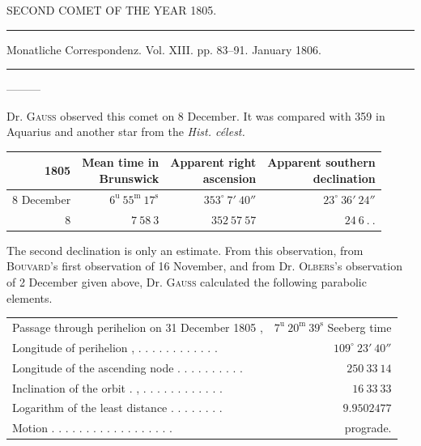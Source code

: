 \begin{center}
SECOND COMET OF THE YEAR 1805.

\rule{0.6\linewidth}{0.4pt}

Monatliche Correspondenz. Vol. XIII. pp. 83–91. January 1806.

\rule{0.6\linewidth}{0.4pt}

—\quad—\quad—
\end{center}

Dr. \textsc{Gauss} observed this comet on 8 December. It was compared with 359 in Aquarius and another star from the \emph{Hist. célest.}

\begin{center}
\begingroup\fontsize{9}{11}\selectfont\setlength{\tabcolsep}{3pt}\renewcommand{\arraystretch}{1.1}
\begin{tabular}{r|r|r|r}
1805 & \shortstack{Mean time in\\Brunswick} & \shortstack{Apparent right\\ascension} & \shortstack{Apparent southern\\declination}\\ \hline
8 December & $6^{\mathrm u}\ 55^{\mathrm m}\ 17^{\mathrm s}$ & $353^\circ\ 7'\ 40''$ & $23^\circ\ 36'\ 24''$ \\
8 & $7\ 58\ 3$ & $352\ 57\ 57$ & $24\ 6\ .\ .$ \\
\end{tabular}\endgroup
\end{center}

\par\indent The second declination is only an estimate. From this observation, from \textsc{Bouvard}’s first observation of 16 November, and from Dr. \textsc{Olbers}’s observation of 2 December given above, Dr. \textsc{Gauss} calculated the following parabolic elements.

\begin{center}
\begingroup\fontsize{8}{10}\selectfont\setlength{\tabcolsep}{3pt}\renewcommand{\arraystretch}{1.1}
\begin{tabular}{lr}
Passage through perihelion on 31 December 1805 , & $7^{\mathrm u}\ 20^{\mathrm m}\ 39^{\mathrm s}$ Seeberg time \\
Longitude of perihelion , . . . . . . . . . . . . & $109^\circ\ 23'\ 40''$ \\
Longitude of the ascending node . . . . . . . . . . & $250\ 33\ 14$ \\
Inclination of the orbit . , . . . . . \raisebox{.3ex}{.} . . . . . . . & $16\ 33\ 33$ \\
Logarithm of the least distance . . . . . . . . & $9.9502477$ \\
Motion . . . . . . . . . . . . . . . . . . & prograde. \\
\end{tabular}\endgroup
\end{center}

